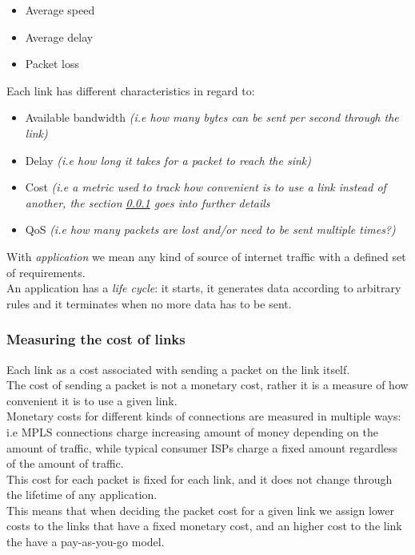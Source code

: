 \documentclass{report}
\begin{document}
\begin{itemize}
	\item Average speed
	\item Average delay
	\item Packet loss
\end{itemize}

Each link has different characteristics in regard to:
\begin{itemize}
	\item Available bandwidth \textit{(i.e how many bytes can be sent per second through the link)}
	\item Delay \textit{(i.e how long it takes for a packet to reach the sink)}
	\item Cost \textit{(i.e a metric used to track how convenient is to use a link instead of another, the section \ref{link_cost} goes into further details}
	\item QoS \textit{(i.e how many packets are lost and/or need to be sent multiple times?)}
\end{itemize} 

\begin{mdframed}[hidealllines=true,backgroundcolor=blue!20]
	With \textit{application} we mean any kind of source of internet traffic with a defined set of requirements. \\
	An application has a \textit{life cycle}: it starts, it generates data according to arbitrary rules and it terminates when no more data has to be sent. 
\end{mdframed} 



\subsubsection{Measuring the cost of links} \label{link_cost}
Each link as a cost associated with sending a packet on the link itself. \\
The cost of sending a packet is not a monetary cost, rather it is a measure of how convenient it is to use a given link. \\
Monetary costs for different kinds of connections are measured in multiple ways: i.e   MPLS connections charge increasing amount of money depending on the amount of traffic, while typical consumer ISPs charge a fixed amount regardless of the amount of traffic. \\
This cost for each packet is fixed for each link, and it does not change through the lifetime of any application. \\
This means that when deciding the packet cost for a given link we assign lower costs to the links that have a fixed monetary cost, and an higher cost to the link the have a pay-as-you-go model.
\end{document}

